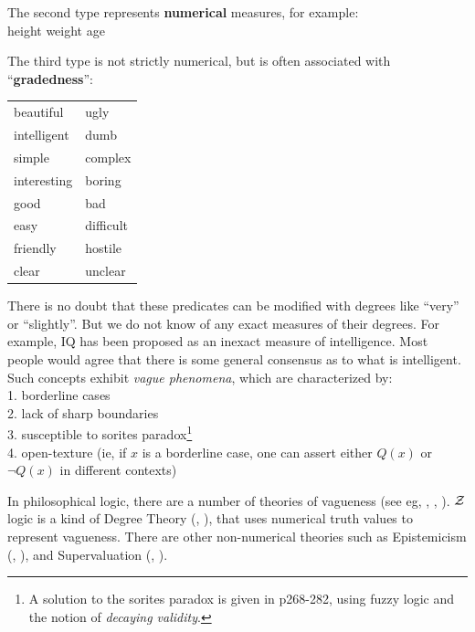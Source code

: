 The second type represents \textbf{numerical} measures, for example:\\
\hspace*{1cm} height \hspace*{1cm} weight \hspace*{1cm} age

The third type is not strictly numerical, but is often associated with ``\textbf{gradedness}'':\\
\hspace*{0.8cm} \begin{tabular}{l l}
beautiful    & ugly\\
intelligent  & dumb\\
simple       & complex\\
interesting  & boring\\
good         & bad\\
easy         & difficult\\
friendly     & hostile\\
clear        & unclear
\end{tabular}

There is no doubt that these predicates can be modified with degrees like ``very'' or ``slightly''.  But we do not know of any exact measures of their degrees.  For example, IQ has been proposed as an inexact measure of intelligence.  Most people would agree that there is some general consensus as to what is intelligent.  Such concepts exhibit \textit{vague phenomena}, which are characterized by:\\
\hspace*{1cm} 1. borderline cases\\
\hspace*{1cm} 2. lack of sharp boundaries\\
\hspace*{1cm} 3. susceptible to sorites paradox\footnote{A solution to the sorites paradox is given in \citep*{Bergmann2008} p268-282, using fuzzy logic and the notion of \textit{decaying validity}.}\\
\hspace*{1cm} 4. open-texture (ie, if $x$ is a borderline case, one can assert either $Q(x)$ or $\neg Q(x)$ in different contexts)

In philosophical logic, there are a number of theories of vagueness (see eg, \citep*{Graff2002}, \citep*{Keefe2000}, \citep*{Shapiro2006}).  $\mathcal{Z}$ logic is a kind of Degree Theory (\citep*{Edgington1992}, \citep*{Sainsbury1986}), that uses numerical truth values to represent vagueness.  There are other non-numerical theories such as Epistemicism (\citep*{Campbell1974}, \citep*{Williamson1994}), and Supervaluation (\citep*{Fine1975}, \citep*{Keefe2000}).

